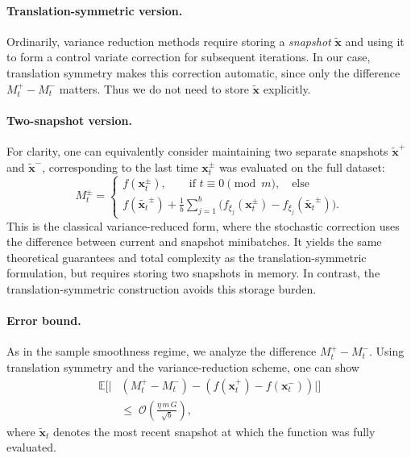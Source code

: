 \documentclass[twoside]{article}
\theoremstyle{plain}
\theoremstyle{definition}
\theoremstyle{remark}
\def\cO{{\mathcal{O}}}
\def\vx{{\bm{x}}}
\newcommand{\E}{\mathbb{E}}
\begin{document}
\paragraph{Translation-symmetric version.}
Ordinarily, variance reduction methods require storing a \emph{snapshot}
$\tilde{\vx}$ and using it to form a control variate correction for subsequent
iterations. In our case, translation symmetry makes this correction automatic,
since only the difference $M_t^+ - M_t^-$ matters. Thus we do not need to store
$\tilde{\vx}$ explicitly.  

\paragraph{Two-snapshot version.}
For clarity, one can equivalently consider maintaining two separate snapshots
$\tilde{\vx}^+$ and $\tilde{\vx}^-$, corresponding to the last time
$\vx_t^\pm$ was evaluated on the full dataset:
\[
   M_t^\pm =
   \begin{cases}
      f(\vx_t^\pm),  \qquad\text{if } t \equiv 0 \pmod{m}, \quad \text{else } \\[6pt]
      f(\tilde{\vx_t}^\pm) 
      + \tfrac{1}{b}\sum_{j=1}^b \Big( f_{\xi_j}(\vx_t^\pm) - f_{\xi_j}(\tilde{\vx_t}^\pm) \Big).
   \end{cases}
\]
This is the classical variance-reduced form, where the stochastic correction
uses the difference between current and snapshot minibatches. It yields the same
theoretical guarantees and total complexity as the translation-symmetric
formulation, but requires storing two snapshots in memory. In contrast, the
translation-symmetric construction avoids this storage burden.

\paragraph{Error bound.}
As in the sample smoothness regime, we analyze the difference
$M_t^+ - M_t^-$. Using translation symmetry and the variance-reduction scheme,
one can show
\begin{align}
    \E\Big[
    \big|&(M_t^+ - M_t^-)
    - (f(\vx_t^+) - f(\vx_t^-))\big|
    \Big]\nonumber\\
    \;&\leq\;
     \cO\!\left(\frac{\eta\,m\,G}{\sqrt{ b}}\right),
\end{align}
where $\tilde{\vx}_t$ denotes the most recent snapshot at which the function
was fully evaluated.
\end{document}
